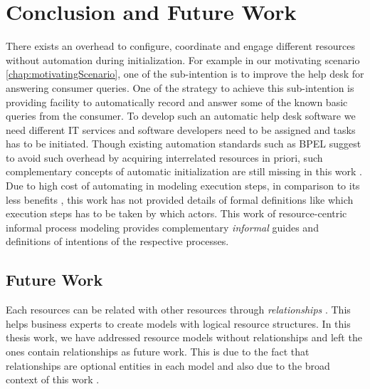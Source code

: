 \chapter{Conclusion and Future Work}
\label{chap:conclusion}

There exists an overhead to configure, coordinate and engage different resources without automation during initialization. For example in our motivating scenario \ref{chap:motivatingScenario}, one of the sub-intention is to improve the help desk for answering consumer queries. One of the strategy to achieve this sub-intention is providing facility to automatically record and answer some of the known basic queries from the consumer.  To develop such an automatic help desk software we need different IT services and software developers need to be assigned and tasks has to be initiated. Though existing automation standards such as BPEL suggest to avoid such overhead by acquiring interrelated resources in priori, such complementary concepts of automatic initialization are still missing in this work  \cite{Sungur2015}. Due to high cost of automating in modeling execution steps, in comparison to its less benefits \cite{Sungur2015}, this work has not provided details of  formal definitions like which execution steps has to be taken by which actors. This work of resource-centric informal process modeling provides complementary \textit{informal} guides and definitions of intentions of the respective processes. 



\section*{Future Work}
\label{sec:futurework}
Each resources can be related with other resources through \textit{relationships} . This helps business experts to create models with logical resource structures. In this thesis work, we have addressed resource models without relationships and left the ones contain relationships as future work. This is due to the fact that relationships are optional entities in each model and also due to the broad context of this work \cite{Sungur2014a}. 



